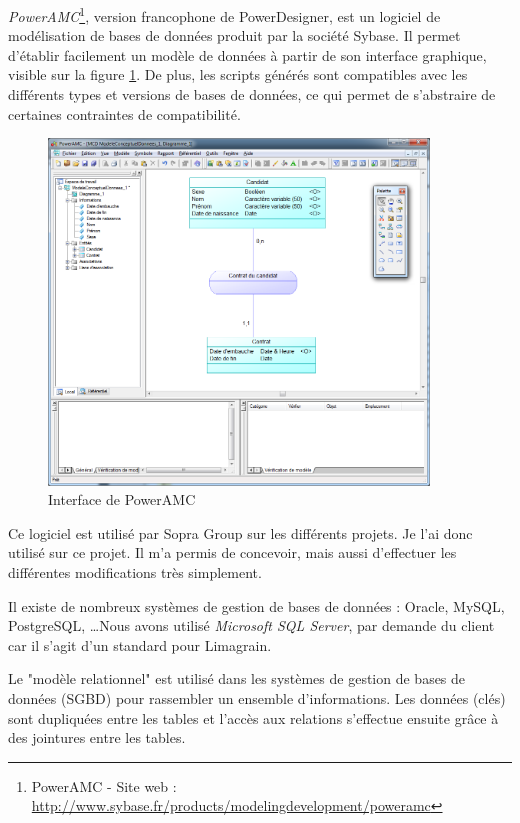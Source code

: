 \textit{PowerAMC}\footnote{PowerAMC - Site web : \url{http://www.sybase.fr/products/modelingdevelopment/poweramc}}, version francophone de PowerDesigner, est un logiciel de modélisation de bases de données produit par la société Sybase.
Il permet d'établir facilement un modèle de données à partir de son interface graphique, visible sur la figure \ref{PowerAMC}.
De plus, les scripts générés sont compatibles avec les différents types et versions de bases de données, ce qui permet de s'abstraire de certaines contraintes de compatibilité.
\begin{figure}[!h]
	\center
	\includegraphics[width=0.9\textwidth]{img/PowerAMC.png}
	\caption{Interface de PowerAMC}
	\label{PowerAMC}
\end{figure}

Ce logiciel est utilisé par Sopra Group sur les différents projets.
Je l'ai donc utilisé sur ce projet.
Il m'a permis de concevoir, mais aussi d'effectuer les différentes modifications très simplement.



Il existe de nombreux systèmes de gestion de bases de données : Oracle, MySQL, PostgreSQL, \ldots Nous avons utilisé \textit{Microsoft SQL Server}, par demande du client car il s'agit d'un standard pour Limagrain.



Le "modèle relationnel" est utilisé dans les systèmes de gestion de bases de données (SGBD) pour rassembler un ensemble d'informations.
Les données (clés) sont dupliquées entre les tables et l'accès aux relations s'effectue ensuite grâce à des jointures entre les tables.

